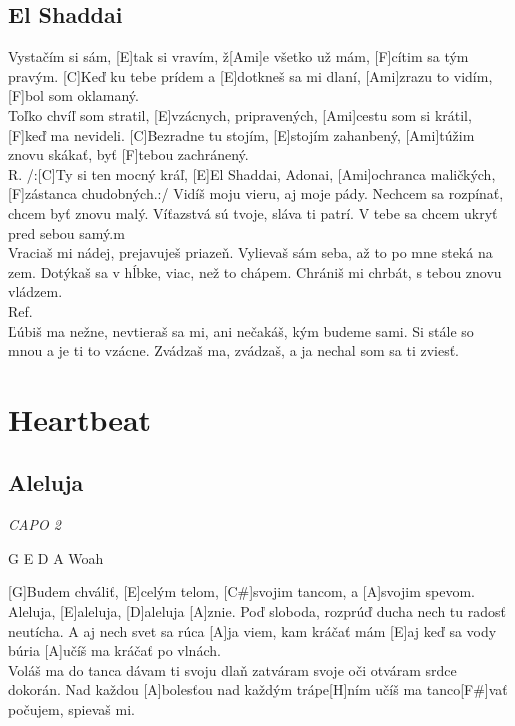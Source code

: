 \documentclass[10pt]{article}
\begin{document}
\begin{Large}
\begin{minipage}{\textwidth}
\subsection{El Shaddai}
\begin{multicols*}{2}
\begin{guitar}
	[C]Vystačím si sám, [E]tak si vravím,
	ž[Ami]e všetko už mám, [F]cítim sa tým pravým.
	[C]Keď ku tebe prídem a [E]dotkneš sa mi dlaní,
	[Ami]zrazu to vidím, [F]bol som oklamaný.
	\\
	[C]Toľko chvíľ som stratil, 
	[E]vzácnych, pripravených,
	[Ami]cestu som si krátil, [F]keď ma nevideli.
	[C]Bezradne tu stojím, [E]stojím zahanbený,
	[Ami]túžim znovu skákať, byť [F]tebou zachránený.
	\\
	R. /:[C]Ty si ten mocný kráľ,
	[E]El Shaddai, Adonai,
	[Ami]ochranca maličkých,
	[F]zástanca chudobných.:/
	\columnbreak
	Vidíš moju vieru, aj moje pády.
	Nechcem sa rozpínať, 
	chcem byť znovu malý.
	Víťazstvá sú tvoje, sláva ti patrí.
	V tebe sa chcem ukryť pred sebou samý.m
	\\
	Vraciaš mi nádej, prejavuješ priazeň.
	Vylievaš sám seba, 
	až to po mne steká na zem.
	Dotýkaš sa v hĺbke, viac, než to chápem.
	Chrániš mi chrbát, s tebou znovu vládzem.
	\\
	Ref.
	\\
	Ľúbiš ma nežne, nevtieraš sa mi,
	ani nečakáš, kým budeme sami.
	Si stále so mnou a je ti to vzácne.
	Zvádzaš ma, zvádzaš,
	a ja nechal som sa ti zviesť.
\end{guitar}
\end{multicols*}
\end{minipage}

\newpage

\begin{minipage}{\textwidth}
\section{Heartbeat}
\subsection{Aleluja}
\textit{CAPO 2}
\begin{multicols*}{3}
\begin{guitar}
	G E D A Woah
		
	[G]Budem chváliť, 
	[E]celým telom,
	[C#]svojim tancom,
	a [A]svojim spevom.
	\\
	[G]Aleluja, [E]aleluja, 
	[D]aleluja [A]znie.
	Poď sloboda, rozprúď ducha
	nech tu radosť neutícha.
	\columnbreak
	[E]A aj nech svet sa rúca
	[A]ja viem, kam kráčať mám
	[E]aj keď sa vody búria
	[A]učíš ma kráčať po vlnách.
	\\
	Voláš ma do tanca
	dávam ti svoju dlaň
	zatváram svoje oči
	otváram srdce dokorán.
	\columnbreak
	[G]Nad každou [A]bolesťou
	nad každým trápe[H]ním
	učíš ma tanco[F#]vať
	počujem, spievaš mi.
\end{guitar}
\end{multicols*}
\end{minipage}


\end{Large}
\end{document}
